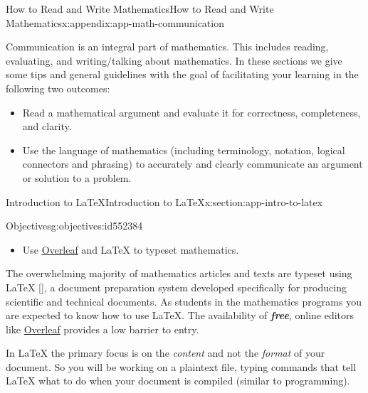 \documentclass[oneside,10pt,]{book}
\newcommand{\xreffont}{\relax}
\newcommand{\alert}[1]{\textbf{\textit{#1}}}
\numberwithin{equation}{section}
\newenvironment{codedisplay}
{\VerbatimEnvironment\begin{center}\begin{lrbox}{\codedisplaybox}\begin{BVerbatim}}
{\end{BVerbatim}\end{lrbox}\usebox{\codedisplaybox}\end{center}}
\begin{document}
\begin{appendixptx}{How to Read and Write Mathematics}{}{How to Read and Write Mathematics}{}{}{x:appendix:app-math-communication}
\begin{introduction}{}%
Communication is an integral part of mathematics. This includes reading, evaluating, and writing\slash{}talking about mathematics. In these sections we give some tips and general guidelines with the goal of facilitating your learning in the following two outcomes:%
\begin{itemize}[label=\textbullet]
\item{}Read a mathematical argument and evaluate it for correctness, completeness, and clarity.%
\item{}Use the language of mathematics (including terminology, notation, logical connectors and phrasing) to accurately and clearly communicate an argument or solution to a problem.%
\end{itemize}
%
\end{introduction}%
%
%
\typeout{************************************************}
\typeout{************************************************}
%
\begin{sectionptx}{Introduction to \LaTeX{}}{}{Introduction to \LaTeX{}}{}{}{x:section:app-intro-to-latex}
\begin{objectives}{Objectives}{g:objectives:id552384}
%
\begin{itemize}[label=\textbullet]
\item{}Use \href{https://www.overleaf.com/}{Overleaf} and \LaTeX{} to typeset mathematics.%
\end{itemize}
\end{objectives}
The overwhelming majority of mathematics articles and texts are typeset using \LaTeX{} \hyperlink{x:biblio:bib-latex}{[{\xreffont 7}]}, a document preparation system developed specifically for producing scientific and technical documents. As students in the mathematics programs you are expected to know how to use \LaTeX{}. The availability of \alert{free}, online editors like \href{https://www.overleaf.com/}{Overleaf} provides a low barrier to entry.%
\par
In \LaTeX{} the primary focus is on the \emph{content} and not the \emph{format} of your document. So you will be working on a plaintext file, typing commands that tell \LaTeX{} what to do when your document is compiled (similar to programming).%
\end{sectionptx}
\end{appendixptx}
\end{document}
